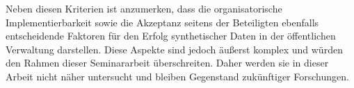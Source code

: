 \begin{spacing}{1.5}
Neben diesen Kriterien ist anzumerken, dass die organisatorische Implementierbarkeit sowie die Akzeptanz seitens der Beteiligten ebenfalls entscheidende Faktoren für den Erfolg synthetischer Daten in der öffentlichen Verwaltung darstellen. Diese Aspekte sind jedoch äußerst komplex und würden den Rahmen dieser Seminararbeit überschreiten. Daher werden sie in dieser Arbeit nicht näher untersucht und bleiben Gegenstand zukünftiger Forschungen.

\end{spacing}